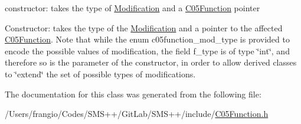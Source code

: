 constructor\+: takes the type of \mbox{\hyperlink{class_s_m_spp__di__unipi__it_1_1_modification}{Modification}} and a \mbox{\hyperlink{class_s_m_spp__di__unipi__it_1_1_c05_function}{C05\+Function}} pointer 

Constructor\+: takes the type of the \mbox{\hyperlink{class_s_m_spp__di__unipi__it_1_1_modification}{Modification}} and a pointer to the affected \mbox{\hyperlink{class_s_m_spp__di__unipi__it_1_1_c05_function}{C05\+Function}}. Note that while the enum c05function\+\_\+mod\+\_\+type is provided to encode the possible values of modification, the field f\+\_\+type is of type \char`\"{}int\char`\"{}, and therefore so is the parameter of the constructor, in order to allow derived classes to \char`\"{}extend\char`\"{} the set of possible types of modifications. 

The documentation for this class was generated from the following file\+:\begin{DoxyCompactItemize}
\item 
/\+Users/frangio/\+Codes/\+S\+M\+S++/\+Git\+Lab/\+S\+M\+S++/include/\mbox{\hyperlink{_c05_function_8h}{C05\+Function.\+h}}\end{DoxyCompactItemize}
